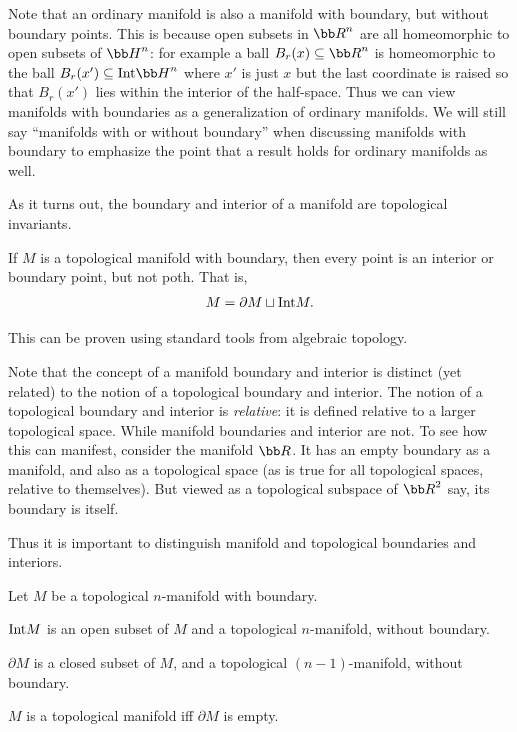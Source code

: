 Note that an ordinary manifold is also a manifold with boundary, but without boundary points.
This is because open subsets in $\bR^n$ are all homeomorphic to open subsets of $\bH^n$: for example a ball $B_r(x)\subseteq\bR^n$ is homeomorphic
to the ball $B_r(x')\subseteq\Int\bH^n$ where $x'$ is just $x$ but the last coordinate is raised so that $B_r(x')$ lies within the interior of the
half-space.
Thus we can view manifolds with boundaries as a generalization of ordinary manifolds.
We will still say ``manifolds with or without boundary'' when discussing manifolds with boundary to emphasize the point that a result holds
for ordinary manifolds as well.

As it turns out, the boundary and interior of a manifold are topological invariants.

\bthrm

    If $M$ is a topological manifold with boundary, then every point is an interior or boundary point, but not poth.
    That is,
    $$ M = \partial M \sqcup {\rm Int} M . $$

\ethrm

This can be proven using standard tools from algebraic topology.

Note that the concept of a manifold boundary and interior is distinct (yet related) to the notion of a topological boundary and interior.
The notion of a topological boundary and interior is {\it relative\/}: it is defined relative to a larger topological space.
While manifold boundaries and interior are not.
To see how this can manifest, consider the manifold $\bR$.
It has an empty boundary as a manifold, and also as a topological space (as is true for all topological spaces, relative to themselves).
But viewed as a topological subspace of $\bR^2$ say, its boundary is itself.

Thus it is important to distinguish manifold and topological boundaries and interiors.

\bprop

    Let $M$ be a topological $n$-manifold with boundary.
    \benum
        \item ${\rm Int} M$ is an open subset of $M$ and a topological $n$-manifold, without boundary.
        \item $\partial M$ is a closed subset of $M$, and a topological $(n-1)$-manifold, without boundary.
        \item $M$ is a topological manifold iff $\partial M$ is empty.
    \eenum

\eprop


